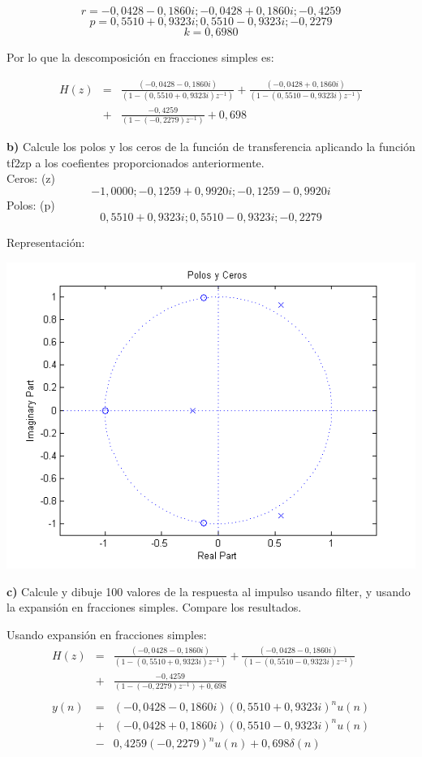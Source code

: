 \documentclass[a4paper,12pt]{article}
\begin{document}


$$ r = -0,0428 -0,1860i; -0,0428 + 0,1860i; -0,4259 $$
$$ p = 0,5510 + 0,9323i; 0,5510 - 0,9323i; -0,2279 $$
$$ k = 0,6980 $$

Por lo que la descomposición en fracciones simples es:

\begin{eqnarray*}
H(z) & = & \frac{(-0,0428 -0,1860i)}{(1 - (0,5510 + 0,9323i) z^{-1})} + \frac{(-0,0428 + 0,1860i)}{(1 - (0,5510 - 0,9323i) z^{-1})} \\ & + & \frac{-0,4259}{(1 - (-0,2279) z^{-1})} + 0,698
\end{eqnarray*}

\textbf{b)} Calcule los polos y los ceros de la función de transferencia aplicando la función tf2zp a los coefientes proporcionados anteriormente.\\



Ceros: (z)\\
$$ -1,0000; -0,1259 + 0,9920i; -0,1259 - 0,9920i $$
Polos: (p)\\
$$ 0,5510 + 0,9323i; 0,5510 - 0,9323i; -0,2279 $$

Representación: \\

\begin{center}
\includegraphics[width=.8 \textwidth]{ejercicio-5-b.png}
\end{center}

\textbf{c)} Calcule y dibuje 100 valores de la respuesta al impulso usando filter, y usando la expansión en fracciones simples. Compare los resultados.

Usando expansión en fracciones simples:\\
\begin{eqnarray*}
H(z) & = & \frac{(-0,0428 - 0,1860i)}{(1 - (0,5510 + 0,9323i) z^{-1})} + \frac{(-0,0428 - 0,1860i)}{(1 - (0,5510 - 0,9323i) z^{-1})} \\ & + & \frac{-0,4259}{(1 - (-0,2279) z^{-1}) + 0,698} \\ \\
y(n) & = & (-0,0428 -0,1860i)(0,5510 + 0,9323i)^n u(n) \\ & + & (-0,0428 + 0,1860i)(0,5510 - 0,9323i)^n u(n) \\ & - & 0,4259 (-0,2279)^n u(n) + 0,698 \delta(n)
\end{eqnarray*}
\end{document}
